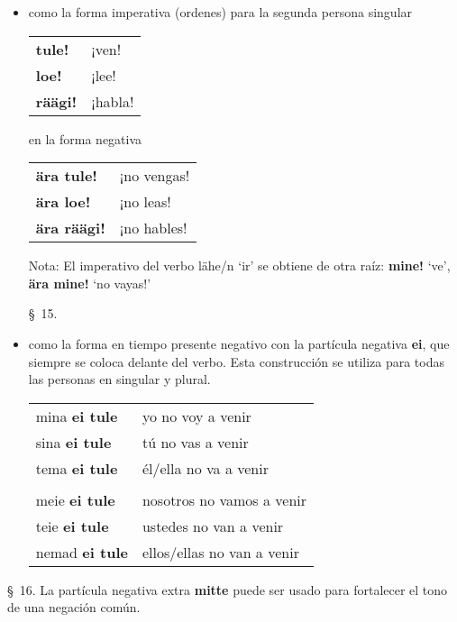 \begin{itemize}
	\item como la forma imperativa (ordenes) para la segunda persona singular

	\begin{center}
	\begin{tabular}{ l l }
		\textbf{tule!}	& ¡ven! \\
		\textbf{loe!}	& ¡lee! \\
		\textbf{räägi!}	& ¡habla!
	\end{tabular}	
	\end{center}
	\bigskip

	en la forma negativa

	\begin{center}
	\begin{tabular}{ l l }
		\textbf{ära tule!}	& ¡no vengas! \\
		\textbf{ära loe!}	& ¡no leas! \\
		\textbf{ära räägi!}	& ¡no hables!
	\end{tabular}	
	\end{center}
	\bigskip

	Nota: El imperativo del verbo lähe/n `ir' se obtiene de otra raíz: \textbf{mine!} `ve', \textbf{ära mine!} `no vayas!'

	\S\ 15. 

	\item como la forma en tiempo presente negativo con la partícula negativa \textbf{ei}, que siempre se coloca delante del verbo. Esta construcción se utiliza para todas las personas en singular y plural.

	\begin{center}
	\begin{tabular}{ l l }
		mina \textbf{ei tule}	& yo no voy a venir \\
		sina \textbf{ei tule}	& tú no vas a venir \\
		tema \textbf{ei tule}	& él/ella no va a venir \\
		& \\
		meie \textbf{ei tule}	& nosotros no vamos a venir \\
		teie \textbf{ei tule}	& ustedes no van a venir \\
		nemad \textbf{ei tule}	& ellos/ellas no van a venir
	\end{tabular}	
	\end{center}	
	\bigskip
\end{itemize}

\S\ 16. La partícula negativa extra \textbf{mitte} puede ser usado para fortalecer el tono de una negación común. 

